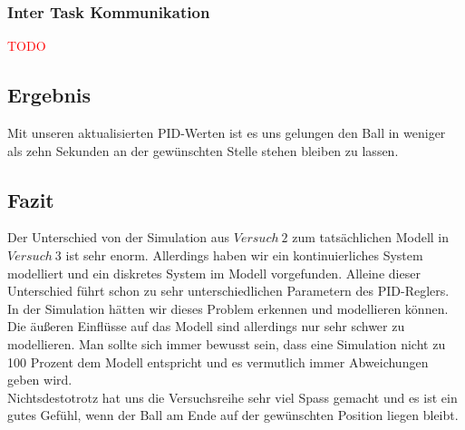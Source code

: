 \subsubsection{Inter Task Kommunikation}
\textcolor{red}{TODO}

\subsection{Ergebnis}
Mit unseren aktualisierten PID-Werten ist es uns gelungen den Ball in weniger als zehn Sekunden an der gewünschten Stelle stehen bleiben zu lassen.\\

\subsection{Fazit}
Der Unterschied von der Simulation aus $Versuch\ 2$ zum tatsächlichen Modell in $Versuch\ 3$ ist sehr enorm. Allerdings haben wir ein kontinuierliches System modelliert und ein diskretes System im Modell vorgefunden. Alleine dieser Unterschied führt schon zu sehr unterschiedlichen Parametern des PID-Reglers. In der Simulation hätten wir dieses Problem erkennen und modellieren können. \\
Die äußeren Einflüsse auf das Modell sind allerdings nur sehr schwer zu modellieren. Man sollte sich immer bewusst sein, dass eine Simulation nicht zu 100 Prozent dem Modell entspricht und es vermutlich immer Abweichungen geben wird. \\
Nichtsdestotrotz hat uns die Versuchsreihe sehr viel Spass gemacht und es ist ein gutes Gefühl, wenn der Ball am Ende auf der gewünschten Position liegen bleibt.